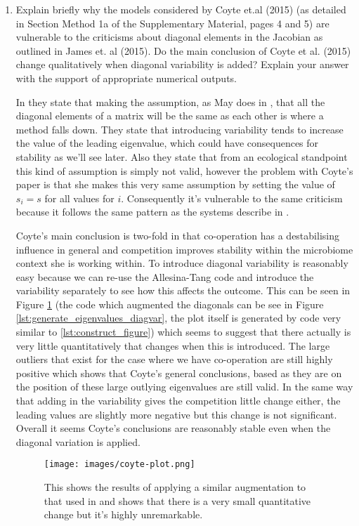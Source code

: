 \documentclass[11pt]{scrreprt}
\begin{document}
\begin{enumerate}
		\newpage
		
		\item Explain briefly why the models considered by Coyte et.al (2015) (as detailed in Section Method 1a of the Supplementary Material, pages 4 and 5) are vulnerable to the criticisms about diagonal elements in the Jacobian as outlined in James et. al (2015). Do the main conclusion of Coyte et al. (2015) change qualitatively when diagonal variability is added? Explain your answer with the support of appropriate numerical outputs.
		
		In \citet{James2015} they state that making the assumption, as May does in \cite{May1972}, that all the diagonal elements of a matrix will be the same as each other is where a method falls down. They state that introducing variability tends to increase the value of the leading eigenvalue, which could have consequences for stability as we'll see later. Also they state that from an ecological standpoint this kind of assumption is simply not valid, however the problem with Coyte's paper is that she makes this very same assumption by setting the value of $s_i = s$ for all values for $i$. Consequently it's vulnerable to the same criticism because it follows the same pattern as the systems describe in \citet{James2015}. 
		
		Coyte's main conclusion is two-fold in that co-operation has a destabilising influence in general and competition improves stability within the microbiome context she is working within. To introduce diagonal variability is reasonably easy because we can re-use the Allesina-Tang code and introduce the variability separately to see how this affects the outcome. This can be seen in Figure \ref{fig:coyte_figure} (the code which augmented the diagonals can be see in Figure \ref{lst:generate_eigenvalues_diagvar}, the plot itself is generated by code very similar to \ref{lst:construct_figure}) which seems to suggest that there actually is very little quantitatively that changes when this is introduced. The large outliers that exist for the case where we have co-operation are still highly positive which shows that Coyte's general conclusions, based as they are on the position of these large outlying eigenvalues are still valid. In the same way that adding in the variability gives the competition little change either, the leading values are slightly more negative but this change is not significant. Overall it seems Coyte's conclusions are reasonably stable even when the diagonal variation is applied.
		
		\begin{figure}[ht]
			\begin{center}
				\texttt{[image: images/coyte-plot.png]}
			\end{center}
			\caption{This shows the results of applying a similar augmentation to that used in \citet{James2015} and shows that there is a very small quantitative change but it's highly unremarkable.}
			\label{fig:coyte_figure}
		\end{figure}
		
	\end{enumerate}
	
\end{document}
